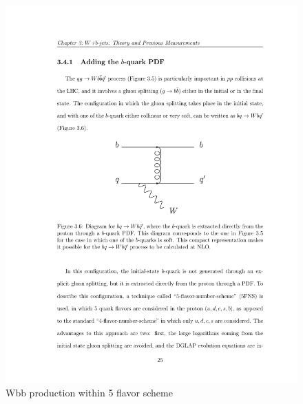 \par

\begin{figure}[htbp]
	\centering
		\includegraphics{Figures/5FS_diag.pdf}
	\caption[Wbb production within 5 flavor scheme]{Wbb production within 5 flavor scheme}
	\label{fig:5FS_diag}
\end{figure}

